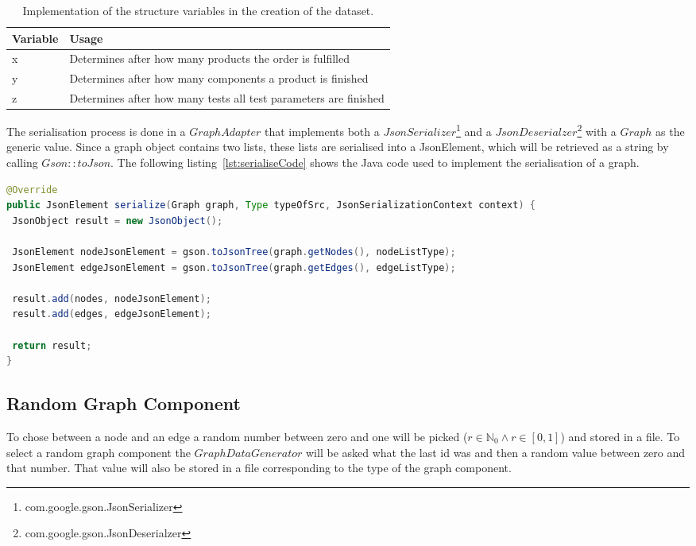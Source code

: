 \begin{table}[h!]
  \begin{tabularx}{\textwidth}{ | l | X | }
    \hline
    Variable & Usage \\ \hline \hline
    x & Determines after how many products the order is fulfilled \\ \hline
    y & Determines after how many components a product is finished \\ \hline
    z & Determines after how many tests all test parameters are finished \\ \hline
  \end{tabularx}
  \caption{Implementation of the structure variables in the creation of the dataset.}
  \label{tab:recorderVariables}
\end{table}

The serialisation process is done in a $ GraphAdapter $ that implements both a $ JsonSerializer $\footnote{com.google.gson.JsonSerializer} and a $ JsonDeserialzer $\footnote{com.google.gson.JsonDeserialzer} with a $ Graph $ as the generic value.
Since a graph object contains two lists,
these lists are serialised into a JsonElement,
which will be retrieved as a string by calling $ Gson::toJson $.
The following listing~\ref{lst:serialiseCode} shows the Java code used to implement the serialisation of a graph.

\begin{lstlisting}[language=Java,label={lst:serialiseCode},caption={Serialisation of a graph object.}]
@Override
public JsonElement serialize(Graph graph, Type typeOfSrc, JsonSerializationContext context) {
 JsonObject result = new JsonObject();

 JsonElement nodeJsonElement = gson.toJsonTree(graph.getNodes(), nodeListType);
 JsonElement edgeJsonElement = gson.toJsonTree(graph.getEdges(), edgeListType);

 result.add(nodes, nodeJsonElement);
 result.add(edges, edgeJsonElement);

 return result;
}
\end{lstlisting}

\subsection{Random Graph Component}
To chose between a node and an edge a random number between zero and one will be picked ($ r \in \mathbb{N}_0 \wedge r \in [ 0, 1 ] $) and stored in a file.
To select a random graph component the $ GraphDataGenerator $ will be asked what the last id was and then a random value between zero and that number.
That value will also be stored in a file corresponding to the type of the graph component.


